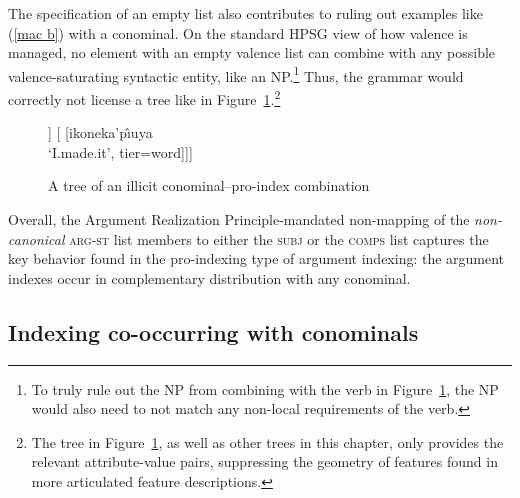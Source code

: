 \documentclass[output=paper
	        ,collection
	        ,collectionchapter
 	        ,biblatex
                ,babelshorthands
                ,newtxmath
                ,draftmode
                ,colorlinks, citecolor=brown
]{langscibook}
\begin{document}
The specification of an empty list also contributes to ruling out examples like (\ref{mac b}) with a conominal. On the standard HPSG view of how valence is managed, no element with an empty valence list can combine with any possible valence-saturating syntactic entity, like an NP.\footnote{To truly rule out the NP from combining with the verb in Figure~\ref{no conominal}, the NP would also need to not match any non-local requirements of the verb.} Thus, the grammar would correctly not license a tree like in Figure~\ref{no conominal}.\footnote{The tree in Figure~\ref{no conominal}, as well as other trees in this chapter, only provides the relevant attribute-value pairs, suppressing the geometry of features found in more articulated feature descriptions.}
%
\begin{figure}[htp]
\centering
\begin{forest}
[* 
	[NP[uur\^{\i}ya \\ `me.\textsc{erg}' ,tier=word,roof]] 
	[ 
[ikoneka'p\^{\i}uya \\ `I.made.it', tier=word]]]
\end{forest}
\caption{A tree of an illicit conominal--pro-index combination}
\label{no conominal}
\end{figure}

Overall, the Argument Realization Principle-mandated non-mapping of the \textit{non-canonical} \textsc{arg-st} list members to either the \textsc{subj} or the \textsc{comps} list captures the key behavior found in the pro-indexing type of argument indexing: the argument indexes occur in complementary distribution with any conominal.    
 
\subsection{Indexing co-occurring with conominals} 
\end{document}
